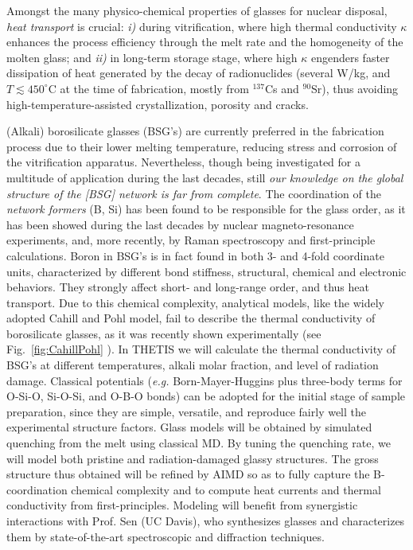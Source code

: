 Amongst the many physico-chemical properties of glasses for nuclear disposal, \textit{heat transport} is crucial: \textit{i)} during vitrification, where high thermal conductivity $\kappa$ enhances the process efficiency through the melt rate and the homogeneity of the molten glass;\cite{SugawaraJNM14,KimJNCS15} and \textit{ii)} in long-term storage stage, where high $\kappa$ engenders faster dissipation of heat generated by the decay of radionuclides (several W/kg, and $T \lesssim 450^\circ$C at the time of fabrication, mostly from $^{137}$Cs and $^{90}$Sr), thus avoiding high-temperature-assisted crystallization, porosity and cracks.\cite{MatzkeJNM93}

(Alkali) borosilicate glasses (BSG's) are currently preferred in the fabrication process due to their lower melting temperature, reducing stress and corrosion of the vitrification apparatus. Nevertheless, though being investigated for a multitude of application during the last decades, still \textit{our knowledge on the global structure of the [BSG] network is far from complete}.\cite{PedesseauPRB15} 
The coordination of the \textit{network formers} (B, Si) has been found to be responsible for the glass order, as it has been showed during the last decades by nuclear magneto-resonance experiments,\cite{YunJNCS78,YunJNCS79,DellJNCS83} and, more recently, by Raman spectroscopy\cite{ManaraAM09} and first-principle calculations.\cite{PedesseauPRB15} Boron in BSG's is in fact found in both 3- and 4-fold coordinate units, characterized by different bond stiffness, structural, chemical and electronic behaviors. They strongly affect short- and long-range order, and thus heat transport. Due to this chemical complexity, analytical models, like the widely adopted Cahill and Pohl model,\cite{CahillARPC88} fail to describe the thermal conductivity of borosilicate glasses, as it was recently shown experimentally (see Fig.~\ref{fig:CahillPohl} \cite{KimJNCS17}). In THETIS we will calculate the thermal conductivity of BSG's at different temperatures, alkali molar fraction, and level of radiation damage. Classical potentials (\textit{e.g.} Born-Mayer-Huggins plus three-body terms for O-Si-O, Si-O-Si, and O-B-O bonds) can be adopted for the initial stage of sample preparation, since they are simple, versatile, and reproduce fairly well the experimental structure factors.\cite{DelayePRB00, CormierPRB00} Glass models will be obtained by simulated quenching from the melt using classical MD. By tuning the quenching rate, we will model both pristine and radiation-damaged glassy structures.\cite{DelayeJNCS11, PeugetJNCS13} 
The gross structure thus obtained will be refined by AIMD so as to fully capture the B-coordination chemical complexity and to compute heat currents and thermal conductivity from first-principles. Modeling will benefit from synergistic interactions with Prof. Sen (UC Davis), who synthesizes glasses and characterizes them by state-of-the-art spectroscopic and diffraction techniques.

